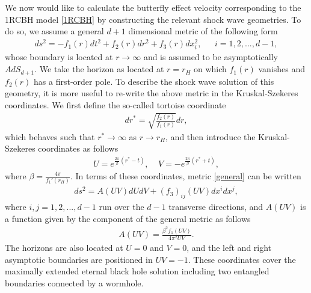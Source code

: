 \documentclass[preprintnumbers,aps,prd,longbibliography,nofootinbib,nobibnotes,amsmath,amssymb]{revtex4}
\begin{document}
We now would like to calculate  the butterfly effect velocity corresponding to the 1RCBH model \eqref{1RCBH} by constructing the relevant shock wave geometries. To do so, we assume a  general $d+1$ dimensional metric of the following form 
\begin{align}\label{general}
ds^2=-f_1(r)dt^2+f_2(r)dr^2+f_3(r)dx_i^2 , \ \ \ \ \ \ \ i=1,2,...,d-1,
\end{align}
whose boundary is located at $r\rightarrow \infty$ and  is assumed to be asymptotically $AdS_{d+1}$. We take the horizon as located at $r=r_H$ on which $f_1(r)$ vanishes and $f_2(r)$ has a first-order pole.  To describe the  shock wave solution of this geometry,  it is more useful to re-write  the above metric in the Kruskal-Szekeres coordinates. We  first define the so-called tortoise coordinate
\begin{align}
dr^*=\sqrt{\frac{f_2(r)}{f_1(r)}}dr,
\end{align}
which behaves such that $r^*\rightarrow \infty$ as $r\rightarrow r_H$, and then introduce the  Kruskal-Szekeres coordinates as follows 
\begin{align}
U=e^{\frac{2\pi}{\beta} (r^*-t)}, \ \ \ \ \  V=-e^{\frac{2\pi}{\beta} (r^*+t)},
\end{align}
  where $\beta = \frac{4 \pi}{f_1'(r_H)}$. In terms of these coordinates, metric \eqref{general}  can  be written
\begin{align}
ds^2=A(UV)dUdV+(f_3)_{ij}(UV)dx^idx^j,
\end{align}
where $ i,j=1,2,...,d-1$ run over the $d-1$ transverse directions, and $A(UV)$ is a function given by the component of the general metric as follows
\begin{align}
A(UV)=\frac{\beta^2 f_1(UV)}{4\pi ^2 UV}.
\end{align}
The horizons are also located  at $U=0$ and $V=0$, and the left and right asymptotic boundaries are positioned in $UV=-1$. These coordinates cover the maximally extended eternal black hole solution including two entangled boundaries connected by a wormhole.
\end{document}
